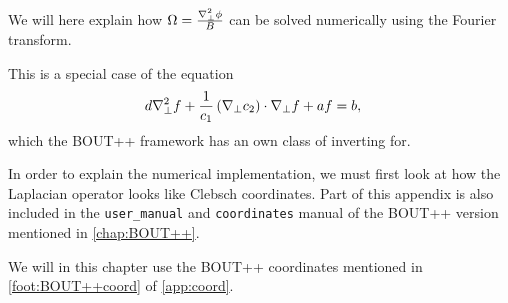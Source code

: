 We will here explain how $\Omega = \frac{\nabla_\perp^2\phi}{B}$ can be solved numerically using the Fourier transform.

This is a special case of the equation
%
\begin{align}
    d&\nabla_\perp^2f + \frac{1}{c_1}\left(\nabla_\perp c_2\right)\cdot\nabla_\perp f + af = b,
\label{eq:to_invert_tri}
\end{align}
%
which the BOUT++ framework has an own class of inverting for.

In order to explain the numerical implementation, we must first look at how the Laplacian operator looks like Clebsch coordinates.
Part of this appendix is also included in the \texttt{user\_manual} and \texttt{coordinates} manual of the BOUT++ version mentioned in \cref{chap:BOUT++}.

We will in this chapter use the BOUT++ coordinates mentioned in \cref{foot:BOUT++coord} of \cref{app:coord}.


